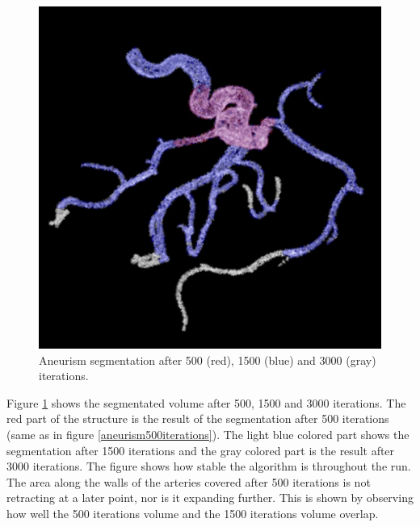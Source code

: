 \begin{figure}[h!]
\centering
\includegraphics[width=.9\textwidth]{results/3D/aneurism_3000_1500__500_iter}
\caption{Aneurism segmentation after 500 (red), 1500 (blue) and 3000 (gray) iterations.}
\label{aneurism30001500500iter}
\end{figure}

Figure \ref{aneurism30001500500iter} shows the segmentated volume after 500, 1500 and 3000 iterations. The red part of the structure is the result of the segmentation after 500 iterations (same as in figure \ref{aneurism500iterations}). The light blue colored part shows the segmentation after 1500 iterations and the gray colored part is the result after 3000 iterations. The figure shows how stable the algorithm is throughout the run. The area along the walls of the arteries covered after 500 iterations is not retracting at a later point, nor is it expanding further. This is shown by observing how well the 500 iterations volume and the 1500 iterations volume overlap.


